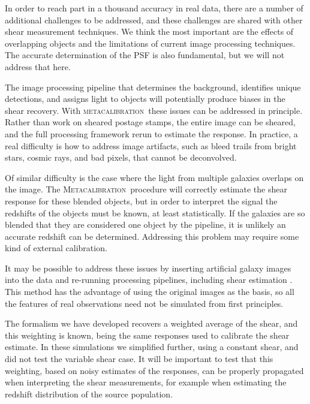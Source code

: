 \documentclass[iop]{emulateapj}
\newcommand{\mcal}{\textsc{metacalibration}}
\newcommand{\Mcal}{\textsc{Metacalibration}}
\begin{document}
In order to reach part in a thousand accuracy in real data, there are a number
of additional challenges to be addressed, and these challenges are shared with
other shear measurement techniques. We think the most important are the effects
of overlapping objects and the limitations of current image processing
techniques.  The accurate determination of the PSF is also fundamental, but we
will not address that here.

The image processing pipeline that  determines the background, identifies
unique detections, and assigns light to objects will potentially produce biases
in the shear recovery.  With \mcal\ these issues can be addressed in principle.
Rather than work on sheared postage stamps, the entire image can be sheared,
and the full processing framework rerun to estimate the response.  In practice,
a real difficulty is how to address image artifacts, such as bleed trails from
bright stars, cosmic rays, and bad pixels, that cannot be deconvolved.

Of similar difficulty is the case where the light from multiple galaxies
overlaps on the image.  The \Mcal\ procedure will correctly estimate the shear
response for these blended objects, but in order to interpret the signal the
redshifts of the objects must be known, at least statistically.  If the
galaxies are so blended that they are considered one object by the pipeline, it
is unlikely an accurate redshift can be determined.  Addressing this problem
may require some kind of external calibration.

It may be possible to address these issues by inserting artificial galaxy
images into the data and re-running processing pipelines, including shear
estimation \citep{Balrog2016}.  This method has the advantage of using the
original images as the basis, so all the features of real observations need not
be simulated from first principles.

The formalism we have developed recovers a weighted average of the shear, and
this weighting is known, being the same responses used to calibrate the shear
estimate.  In these simulations we simplified further, using a constant shear,
and did not test the variable shear case.  It will be important to test that
this weighting, based on noisy estimates of the responses, can be properly
propagated when interpreting the shear measurements, for example when
estimating the redshift distribution of the source population.
\end{document}

